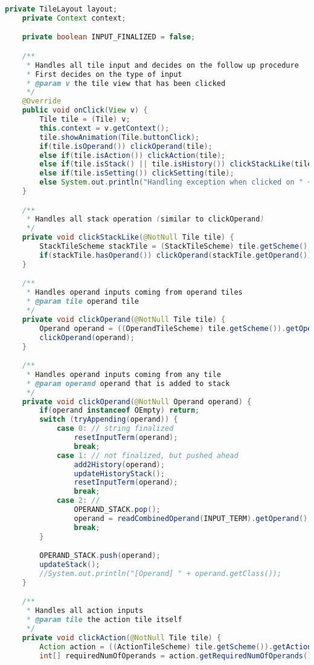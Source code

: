 \begin{lstlisting}[caption=Presenter,label=list:Presenter,language=Java]
    private TileLayout layout;
    private Context context;

    private boolean INPUT_FINALIZED = false;

    /**
     * Handles all tile input and decides on the follow up procedure
     * First decides on the type of input
     * @param v the tile view that has been clicked
     */
    @Override
    public void onClick(View v) {
        Tile tile = (Tile) v;
        this.context = v.getContext();
        tile.showAnimation(Tile.buttonClick);
        if(tile.isOperand()) clickOperand(tile);
        else if(tile.isAction()) clickAction(tile);
        else if(tile.isStack() || tile.isHistory()) clickStackLike(tile);
        else if(tile.isSetting()) clickSetting(tile);
        else System.out.println("Handling exception when clicked on " + tile.getScheme());
    }

    /**
     * Handles all stack operation (similar to clickOperand)
     */
    private void clickStackLike(@NotNull Tile tile) {
        StackTileScheme stackTile = (StackTileScheme) tile.getScheme();
        if(stackTile.hasOperand()) clickOperand(stackTile.getOperand());
    }

    /**
     * Handles operand inputs coming from operand tiles
     * @param tile operand tile
     */
    private void clickOperand(@NotNull Tile tile) {
        Operand operand = ((OperandTileScheme) tile.getScheme()).getOperand();
        clickOperand(operand);
    }

    /**
     * Handles operand inputs coming from any tile
     * @param operand operand that is added to stack
     */
    private void clickOperand(@NotNull Operand operand) {
        if(operand instanceof OEmpty) return;
        switch (tryAppending(operand)) {
            case 0: // string finalized
                resetInputTerm(operand);
                break;
            case 1: // not finalized, but pushed ahead
                add2History(operand);
                updateHistoryStack();
                resetInputTerm(operand);
                break;
            case 2: //
                OPERAND_STACK.pop();
                operand = readCombinedOperand(INPUT_TERM).getOperand();
                break;
        }

        OPERAND_STACK.push(operand);
        updateStack();
        //System.out.println("[Operand] " + operand.getClass());
    }

    /**
     * Handles all action inputs
     * @param tile the action tile itself
     */
    private void clickAction(@NotNull Tile tile) {
        Action action = ((ActionTileScheme) tile.getScheme()).getAction();
        int[] requiredNumOfOperands = action.getRequiredNumOfOperands();


\end{lstlisting}
